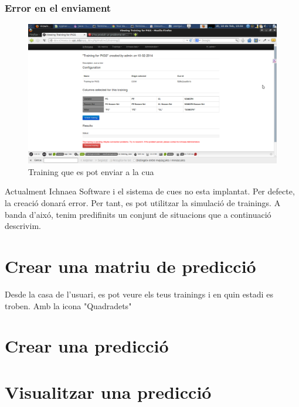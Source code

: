 \subsubsection*{Error en el enviament}
\begin{figure}[h!]
  \centering
  \includegraphics[scale=0.2]{img/userguide/view_training_pending.png}
  \caption{Training que es pot enviar a la cua}
  \label{fig:placement}
\end{figure}

Actualment Ichnaea Software i el sistema de cues no esta implantat. Per defecte, la creaci\'{o} donar\'{a} error. Per tant, es pot utilitzar la simulaci\'{o} de trainings.
A banda d'aix\'{o}, tenim predifinits un conjunt de situacions que a continuaci\'{o} descrivim.

\section{Crear una matriu de predicci\'{o}}
Desde la casa de l'usuari, es pot veure els teus trainings i en quin estadi es troben. Amb la icona "Quadradets"

\section{Crear una predicci\'{o}}

\section{Visualitzar una predicci\'{o}}


